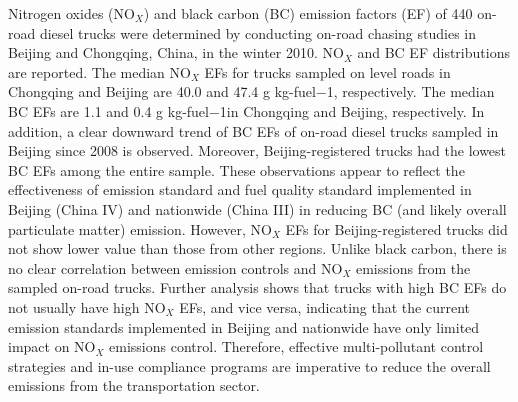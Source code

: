 Nitrogen oxides (NO$_X$) and black carbon (BC) emission factors (EF) of 440 on-road diesel trucks were determined by conducting on-road chasing studies in Beijing and Chongqing, China, in the winter 2010. NO$_X$ and BC EF distributions are reported. The median NO$_X$ EFs for trucks sampled on level roads in Chongqing and Beijing are 40.0 and 47.4 g kg-fuel−1, respectively. The median BC EFs are 1.1 and 0.4 g kg-fuel−1in Chongqing and Beijing, respectively. In addition, a clear downward trend of BC EFs of on-road diesel trucks sampled in Beijing since 2008 is observed. Moreover, Beijing-registered trucks had the lowest BC EFs among the entire sample. These observations appear to reflect the effectiveness of emission standard and fuel quality standard implemented in Beijing (China IV) and nationwide (China III) in reducing BC (and likely overall particulate matter) emission. However, NO$_X$ EFs for Beijing-registered trucks did not show lower value than those from other regions. Unlike black carbon, there is no clear correlation between emission controls and NO$_X$ emissions from the sampled on-road trucks. Further analysis shows that trucks with high BC EFs do not usually have high NO$_X$ EFs, and vice versa, indicating that the current emission standards implemented in Beijing and nationwide have only limited impact on NO$_X$ emissions control. Therefore, effective multi-pollutant control strategies and in-use compliance programs are imperative to reduce the overall emissions from the transportation sector.
